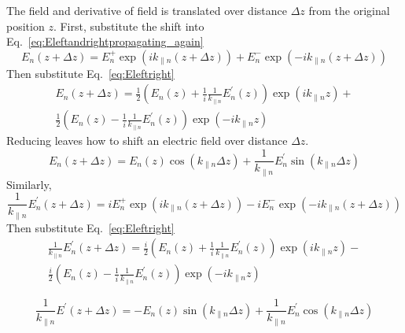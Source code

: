 The field and derivative of field is translated over distance $\Delta z$ from the original position $z$. First, substitute the shift into Eq.~\ref{eq:Eleftandrightpropagating_again}
\begin{equation}
E_n(z+\Delta z) = E_n^+ \exp(i k_{\parallel n} (z+\Delta z)) + E_n^- \exp(-i k_{\parallel n} (z+\Delta z)) 
\end{equation}
Then substitute Eq.~\ref{eq:Eleftright}
\begin{equation}
\begin{gathered}
E_n(z+\Delta z) = \frac{1}{2} \left( E_n(z) + \frac{1}{i} \frac{1}{k_{\parallel n}} E_n^{\prime}(z) \right) \exp(i k_{\parallel n} z) + \\
\frac{1}{2} \left( E_n(z) - \frac{1}{i} \frac{1}{k_{\parallel n}} E_n^{\prime}(z) \right) \exp(-i k_{\parallel n} z) 
\end{gathered}
\end{equation}
Reducing leaves how to shift an electric field over distance $\Delta z$.
\begin{equation}
E_n(z+\Delta z) =E_n(z) \cos(k_{\parallel n} \Delta z) + \frac{1}{k_{\parallel n}} E_n^{\prime} \sin(k_{\parallel n} \Delta z) 
\label{eq:open_channel_field_transfer}
\end{equation}
Similarly,
\begin{equation}
\frac{1}{k_{\parallel n}} E_n^{\prime}(z+\Delta z) = i E_n^+ \exp(i k_{\parallel n} (z+\Delta z)) -i E_n^- \exp(-i k_{\parallel n} (z+\Delta z))
\end{equation}
Then substitute Eq.~\ref{eq:Eleftright}
\begin{equation}
\begin{gathered}
\frac{1}{k_{\parallel n}} E_n^{\prime}(z+\Delta z) =
\frac{i}{2} \left( E_n(z) + \frac{1}{i} \frac{1}{k_{\parallel n}} E_n^{\prime}(z) \right) \exp(i k_{\parallel n} z) -\\
\frac{i}{2} \left( E_n(z) - \frac{1}{i} \frac{1}{k_{\parallel n}} E_n^{\prime}(z) \right) \exp(-i k_{\parallel n} z) 
\end{gathered}
\end{equation}

\begin{equation}
\frac{1}{k_{\parallel n}} E^{\prime}(z+\Delta z)=- E_n(z) \sin(k_{\parallel n} \Delta z) + \frac{1}{k_{\parallel n}} E_n^{\prime} \cos(k_{\parallel n} \Delta z) 
\label{eq:open_channel_deriv_transfer}
\end{equation}


